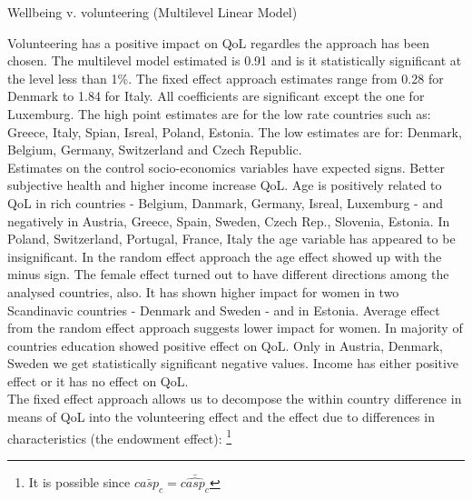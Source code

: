 \documentclass[10pt, letterpaper]{article}
\begin{document}
\begin{spacing}{1.4}

\begin{spacing}{.9}
\begin{table}[H]
\centering 
\caption{Wellbeing v. volunteering (Multilevel Linear Model)}  
\begin{scriptsize} 
	 
      \label{regB} 
\end{scriptsize}
\end{table}
\end{spacing}



Volunteering has a positive impact on QoL regardles the approach has been chosen. The multilevel model estimated is 0.91 and is it statistically significant at the level less than 1\%. The fixed effect approach estimates range from 0.28 for Denmark to 1.84 for Italy. All coefficients are significant except the one for Luxemburg. The high point estimates are for the low rate countries such as: Greece, Italy, Spian, Isreal, Poland, Estonia. The low estimates are for: Denmark, Belgium, Germany, Switzerland and Czech Republic. \\

Estimates on the control socio-economics variables have expected signs. Better subjective health and higher income increase QoL. Age is positively related to QoL in rich countries - Belgium, Danmark, Germany, Isreal, Luxemburg - and negatively in Austria, Greece, Spain, Sweden, Czech Rep.,  Slovenia, Estonia. In Poland, Switzerland, Portugal, France, Italy the age variable has appeared to be insignificant. In the random effect approach the age effect  showed up with the minus sign. The female effect turned out to have different directions among the analysed countries, also.  It has shown higher impact for women in two Scandinavic countries - Denmark and Sweden - and in Estonia. Average effect from the random effect approach suggests lower impact for women. In majority of countries education showed positive effect on QoL. Only in Austria, Denmark, Sweden we get statistically significant negative values. Income has either positive effect or it has no effect on QoL. \\    

The fixed effect approach allows us to decompose the within country difference in means of QoL  into the volunteering effect and the effect due to differences in characteristics (the endowment effect): \footnote{It is possible since $\bar{casp_{c}} = \bar{\hat{casp_c}}$} 


\end{spacing}
\end{document}
